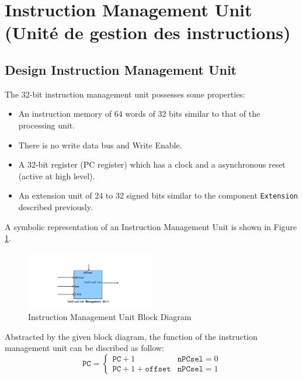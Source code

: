 \section{Instruction Management Unit (Unité de gestion des instructions)}

\subsection{Design Instruction Management Unit}

The 32-bit instruction management unit possesses some properties:
\begin{itemize}
    \item An instruction memory of 64 words of 32 bits similar to that 
    of the processing unit.
    \item There is no write data bus and Write Enable.
    \item A 32-bit register (PC register) which has a clock and a
    asynchronous reset (active at high level).
    \item An extension unit of 24 to 32 signed bits similar to the component \texttt{Extension} described
    previously.
\end{itemize}

A symbolic representation of an Instruction Management Unit
is shown in Figure \ref{fig:IMU}.

\begin{figure}[htp]
    \centering
    \includegraphics[width=0.5\textwidth]{picture/IMU.pdf}
    \caption{Instruction Management Unit Block Diagram}     
    \label{fig:IMU}
\end{figure}

Abstracted by the given block diagram, 
the function of the instruction management unit can be 
discribed as follow:
\begin{equation*}
    \texttt{PC} = \begin{cases}
        \texttt{PC} + 1 & \texttt{nPCsel} = 0 \\
        \texttt{PC} + 1 + \texttt{offset} & \texttt{nPCsel} = 1
    \end{cases}
\end{equation*} 

